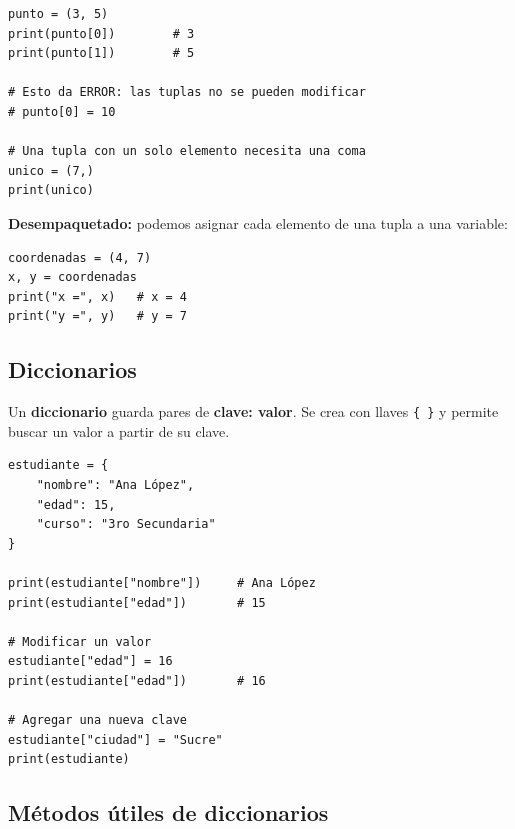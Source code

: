 \documentclass[11pt,a4paper]{article}
\begin{document}
\begin{cajaEjemplo}
\begin{lstlisting}[style=pythonStyle, caption={Creando una tupla}]
punto = (3, 5)
print(punto[0])        # 3
print(punto[1])        # 5

# Esto da ERROR: las tuplas no se pueden modificar
# punto[0] = 10

# Una tupla con un solo elemento necesita una coma
unico = (7,)
print(unico)
\end{lstlisting}

\textbf{Desempaquetado:} podemos asignar cada elemento de una tupla a una variable:
\begin{lstlisting}[style=pythonStyle]
coordenadas = (4, 7)
x, y = coordenadas
print("x =", x)   # x = 4
print("y =", y)   # y = 7
\end{lstlisting}
\end{cajaEjemplo}

\subsection{Diccionarios}

Un \textbf{diccionario} guarda pares de \textbf{clave: valor}. Se crea con llaves \texttt{\{ \}} y permite buscar un valor a partir de su clave.

\begin{cajaEjemplo}
\begin{lstlisting}[style=pythonStyle, caption={Creando un diccionario}]
estudiante = {
    "nombre": "Ana López",
    "edad": 15,
    "curso": "3ro Secundaria"
}

print(estudiante["nombre"])     # Ana López
print(estudiante["edad"])       # 15

# Modificar un valor
estudiante["edad"] = 16
print(estudiante["edad"])       # 16

# Agregar una nueva clave
estudiante["ciudad"] = "Sucre"
print(estudiante)
\end{lstlisting}
\end{cajaEjemplo}

\subsection{Métodos útiles de diccionarios}
\end{document}
